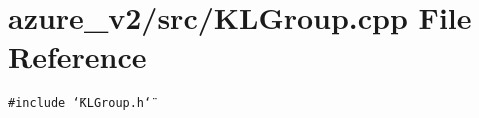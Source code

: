 \section{azure\_\-v2/src/KLGroup.cpp File Reference}
\label{KLGroup_8cpp}
{\tt \#include \char`\"{}KLGroup.h\char`\"{}}\par
